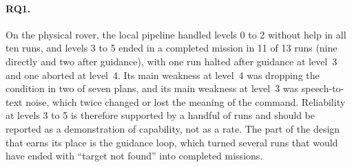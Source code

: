 %
%


%

\label{sec:answers}

\paragraph{RQ1.} On the physical rover, the local pipeline handled levels 0 to 2
without help in all ten runs, and levels 3 to 5 ended in a completed mission in
11 of 13 runs (nine directly and two after guidance), with one run halted after
guidance at level~3 and one aborted at level~4. Its main weakness at level~4 was
dropping the condition in two of seven plans, and its main weakness at level~3
was speech-to-text noise, which twice changed or lost the meaning of the
command. Reliability at levels 3 to 5 is therefore supported by a handful of
runs and should be reported as a demonstration of capability, not as a rate.
The part of the design that earns its place is the guidance loop, which turned
several runs that would have ended with ``target not found'' into completed
missions.

